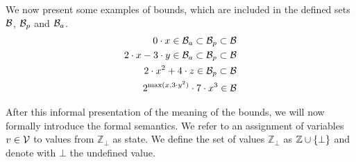 We now present some examples of bounds, which are included in the defined sets $\mathcal{B}$, $\mathcal{B}_p$ and $\mathcal{B}_a$.
\begin{align*}
  0 \cdot x \in \mathcal{B}_a \subset \mathcal{B}_p \subset \mathcal{B} \\
  2 \cdot x - 3 \cdot y \in \mathcal{B}_a \subset \mathcal{B}_p \subset \mathcal{B} \\
  2 \cdot x^2 + 4 \cdot z \in \mathcal{B}_p \subset \mathcal{B} \\
  2^{\max(x,3 \cdot y^2)} \cdot 7 \cdot x^3 \in \mathcal{B}
\end{align*}

After this informal presentation of the meaning of the bounds, we will now formally introduce the formal semantics.
We refer to an assignment of variables $v \in \mathcal{V}$ to values from $\mathbb{Z}_\bot$ as state.
We define the set of values $\mathbb{Z}_\bot$ as $\mathbb{Z} \cup \lbrace \bot \rbrace$ and denote with $\bot$ the undefined value.


